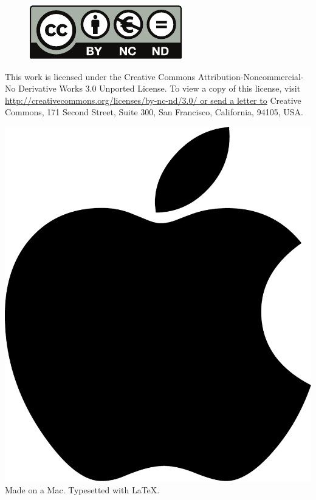 
\newpage
\thispagestyle{empty}

\begin{figure}[ht!]
  \centering
    \includegraphics[width=.5\textwidth]{images/by-nc-nd_eu}
\end{figure}

\vspace{1cm}

  This work is licensed under the Creative Commons Attribution-Noncommercial-No Derivative Works 3.0 Unported License. To view a copy of this license, visit \url{http://creativecommons.org/licenses/by-nc-nd/3.0/ or send a letter to} Creative Commons, 171 Second Street, Suite 300, San Francisco, California, 94105, USA.

\vspace{10cm}

\begin{center}
  \includegraphics[width=.08\textwidth]{images/apple.pdf}\\
  Made on a Mac. Typesetted with \LaTeX.
\end{center}
